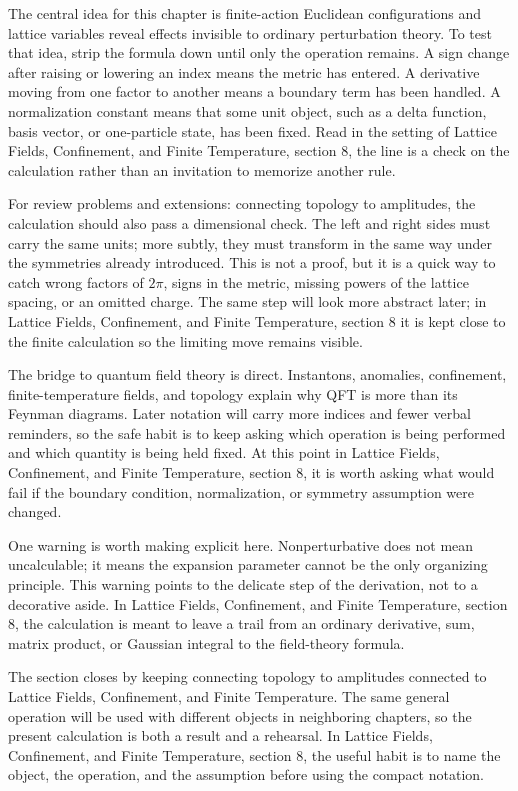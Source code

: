 The central idea for this chapter is finite-action Euclidean configurations and lattice variables reveal effects invisible to ordinary perturbation theory.  To test that idea, strip the formula down until only the operation remains.  A sign change after raising or lowering an index means the metric has entered.  A derivative moving from one factor to another means a boundary term has been handled.  A normalization constant means that some unit object, such as a delta function, basis vector, or one-particle state, has been fixed.  Read in the setting of Lattice Fields, Confinement, and Finite Temperature, section 8, the line is a check on the calculation rather than an invitation to memorize another rule.

For review problems and extensions: connecting topology to amplitudes, the calculation should also pass a dimensional check.  The left and right sides must carry the same units; more subtly, they must transform in the same way under the symmetries already introduced.  This is not a proof, but it is a quick way to catch wrong factors of \(2\pi\), signs in the metric, missing powers of the lattice spacing, or an omitted charge.  The same step will look more abstract later; in Lattice Fields, Confinement, and Finite Temperature, section 8 it is kept close to the finite calculation so the limiting move remains visible.

The bridge to quantum field theory is direct.  Instantons, anomalies, confinement, finite-temperature fields, and topology explain why QFT is more than its Feynman diagrams.  Later notation will carry more indices and fewer verbal reminders, so the safe habit is to keep asking which operation is being performed and which quantity is being held fixed.  At this point in Lattice Fields, Confinement, and Finite Temperature, section 8, it is worth asking what would fail if the boundary condition, normalization, or symmetry assumption were changed.

One warning is worth making explicit here.  Nonperturbative does not mean uncalculable; it means the expansion parameter cannot be the only organizing principle.  This warning points to the delicate step of the derivation, not to a decorative aside.  In Lattice Fields, Confinement, and Finite Temperature, section 8, the calculation is meant to leave a trail from an ordinary derivative, sum, matrix product, or Gaussian integral to the field-theory formula.

The section closes by keeping connecting topology to amplitudes connected to Lattice Fields, Confinement, and Finite Temperature.  The same general operation will be used with different objects in neighboring chapters, so the present calculation is both a result and a rehearsal.  In Lattice Fields, Confinement, and Finite Temperature, section 8, the useful habit is to name the object, the operation, and the assumption before using the compact notation.



